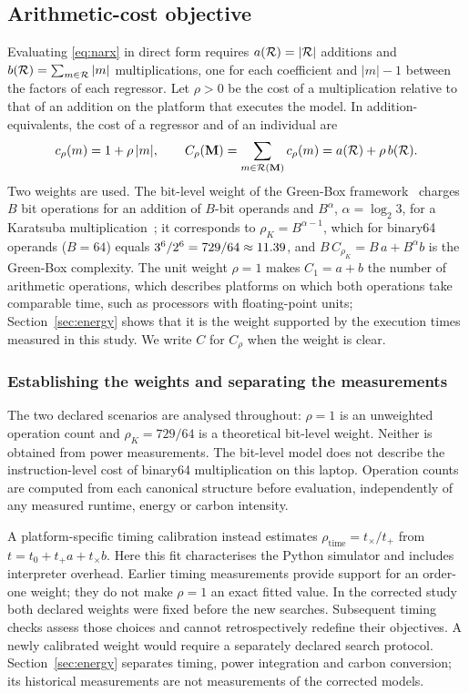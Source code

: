 \subsection{Arithmetic-cost objective}

\begin{definition}\label{def:cost}
Evaluating \eqref{eq:narx} in direct form requires $a(\mathcal{R})=|\mathcal{R}|$ additions and $b(\mathcal{R})=\sum_{m\in\mathcal{R}}|m|$
multiplications, one for each coefficient and $|m|-1$ between the factors of each regressor. Let $\rho>0$ be the cost of
a multiplication relative to that of an addition on the platform that executes the model. In addition-equivalents, the
cost of a regressor and of an individual are
\begin{equation}
c_\rho(m)=1+\rho\,|m|,\qquad
C_\rho(\mathbf{M})=\sum_{m\in\mathcal{R}(\mathbf{M})}c_\rho(m)=a(\mathcal{R})+\rho\,b(\mathcal{R}).
\label{eq:cost}
\end{equation}
Two weights are used. The bit-level weight of the Green-Box framework~\cite{NMN2023} charges $B$ bit
operations for an addition of $B$-bit operands and $B^{\alpha}$, $\alpha=\log_2 3$, for a Karatsuba multiplication~\cite{KO1963}; it corresponds to $\rho_K=B^{\alpha-1}$, which for binary64 operands ($B=64$) equals
$3^6/2^6=729/64\approx11.39$, and $B\,C_{\rho_K}=B\,a+B^{\alpha}b$ is the Green-Box complexity. The unit weight $\rho=1$
makes $C_1=a+b$ the number of arithmetic operations, which describes platforms on which both operations take
comparable time, such as processors with floating-point units; Section~\ref{sec:energy} shows that it is the weight
supported by the execution times measured in this study. We write $C$ for $C_\rho$ when the weight is clear.
\end{definition}

\subsubsection{Establishing the weights and separating the measurements}
The two declared scenarios are analysed throughout: $\rho=1$ is an unweighted operation count and $\rho_K=729/64$ is a theoretical bit-level weight. Neither is obtained from power measurements. The bit-level model does not describe the instruction-level cost of binary64 multiplication on this laptop. Operation counts are computed from each canonical structure before evaluation, independently of any measured runtime, energy or carbon intensity.

A platform-specific timing calibration instead estimates $\rho_{\mathrm{time}}=t_\times/t_+$ from $t=t_0+t_+a+t_\times b$. Here this fit characterises the Python simulator and includes interpreter overhead. Earlier timing measurements provide support for an order-one weight; they do not make $\rho=1$ an exact fitted value. In the corrected study both declared weights were fixed before the new searches. Subsequent timing checks assess those choices and cannot retrospectively redefine their objectives. A newly calibrated weight would require a separately declared search protocol. Section~\ref{sec:energy} separates timing, power integration and carbon conversion; its historical measurements are not measurements of the corrected models.


